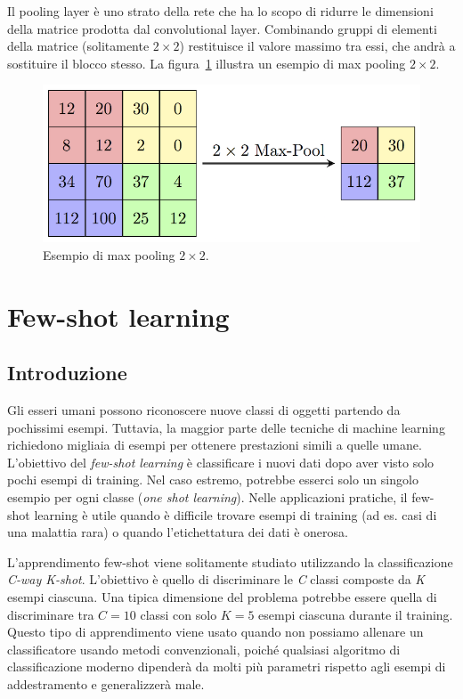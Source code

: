 \documentclass[12pt,a4paper,titlepage]{article}
\begin{document}
Il pooling layer è uno strato della rete che ha lo scopo di ridurre le dimensioni della matrice prodotta dal convolutional layer. Combinando gruppi di elementi della matrice (solitamente $2 \times 2$) restituisce il valore massimo tra essi, che andrà a sostituire il blocco stesso. La figura~\ref{fig:max_pool} illustra un esempio di max pooling $2 \times 2$.

\begin{figure}[h]
	\centering	
	\includegraphics[width=.7\textwidth]{Immagini/maxpool}
	\caption{Esempio di max pooling $2 \times 2$.}
	\label{fig:max_pool}
\end{figure}


\clearpage

\section{Few-shot learning}
\label{sec:few-shot}
\subsection{Introduzione}
Gli esseri umani possono riconoscere nuove classi di oggetti partendo da pochissimi esempi. Tuttavia, la maggior parte delle tecniche di machine learning richiedono migliaia di esempi per ottenere prestazioni simili a quelle umane. L'obiettivo del \textit{few-shot learning} è classificare i nuovi dati dopo aver visto solo pochi esempi di training. Nel caso estremo, potrebbe esserci solo un singolo esempio per ogni classe (\textit{one shot learning}). Nelle applicazioni pratiche, il few-shot learning è utile quando è difficile trovare esempi di training (ad es. casi di una malattia rara) o quando l'etichettatura dei dati è onerosa.

L'apprendimento few-shot viene solitamente studiato utilizzando la classificazione \textit{C-way K-shot}. L'obiettivo è quello di discriminare le \textit{C} classi composte da \textit{K} esempi ciascuna. Una tipica dimensione del problema potrebbe essere quella di discriminare tra $C=10$ classi con solo $K=5$ esempi ciascuna durante il training. Questo tipo di apprendimento viene usato quando non possiamo allenare un classificatore usando metodi convenzionali, poiché qualsiasi algoritmo di classificazione moderno dipenderà da molti più parametri rispetto agli esempi di addestramento e generalizzerà male.
\end{document}

